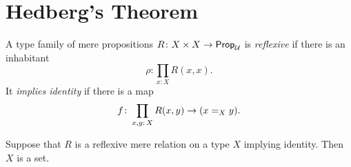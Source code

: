 \section{Hedberg's Theorem}

\begin{defn}
    A type family of mere propositions $R\colon X\times X\to\fun{Prop}_\univ$ is \textsl{reflexive} if there is an inhabitant
    \begin{equation}\label{eq:reflexive-relation}
        \rho\colon\prod_{x\colon X}R(x,x).
    \end{equation}
    It \textsl{implies identity} if there is a map 
    \begin{equation}\label{eq:implies-=}
        f\colon\prod_{x,y\colon X}R(x,y)\to(x\eq Xy).
    \end{equation}
\end{defn}

\begin{thm}\label{thm:reflexive-mere-relation-impl-id}
    Suppose that $R$ is a reflexive mere relation on a type $X$ implying identity. Then $X$ is a set.
\end{thm}

